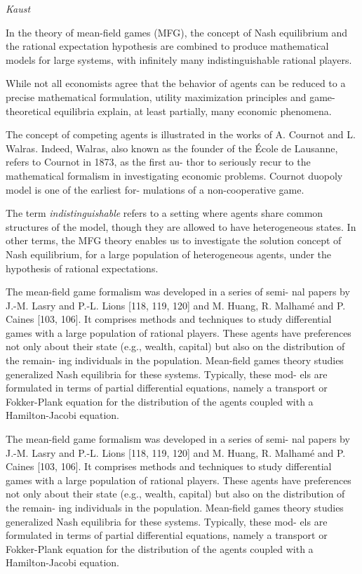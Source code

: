 \documentclass[
]{book}
\begin{document}
\emph{Kaust}

In the theory of mean-field games (MFG), the concept of Nash
equilibrium and the rational expectation hypothesis are combined to
produce mathematical models for large systems, with infinitely many
indistinguishable rational players.

While not all economists agree that the behavior of agents can be reduced
to a precise mathematical formulation, utility maximization principles
and game-theoretical equilibria explain, at least partially, many
economic phenomena.

The concept of competing agents is illustrated in the works of A.
Cournot and L. Walras. Indeed, Walras, also known as the founder
of the École de Lausanne, refers to Cournot in 1873, as the first au-
thor to seriously recur to the mathematical formalism in investigating
economic problems. Cournot duopoly model is one of the earliest for-
mulations of a non-cooperative game.

The term \emph{indistinguishable} refers
to a setting where agents share common structures of the model,
though they are allowed to have heterogeneous states. In other terms,
the MFG theory enables us to investigate the solution concept of Nash
equilibrium, for a large population of heterogeneous agents, under the
hypothesis of rational expectations.

The mean-field game formalism was developed in a series of semi-
nal papers by J.-M. Lasry and P.-L. Lions {[}118, 119, 120{]} and M.
Huang, R. Malhamé and P. Caines {[}103, 106{]}. It comprises methods
and techniques to study differential games with a large population of
rational players. These agents have preferences not only about their
state (e.g., wealth, capital) but also on the distribution of the remain-
ing individuals in the population. Mean-field games theory studies
generalized Nash equilibria for these systems. Typically, these mod-
els are formulated in terms of partial differential equations, namely a
transport or Fokker-Plank equation for the distribution of the agents
coupled with a Hamilton-Jacobi equation.

The mean-field game formalism was developed in a series of semi-
nal papers by J.-M. Lasry and P.-L. Lions {[}118, 119, 120{]} and M.
Huang, R. Malhamé and P. Caines {[}103, 106{]}. It comprises methods
and techniques to study differential games with a large population of
rational players. These agents have preferences not only about their
state (e.g., wealth, capital) but also on the distribution of the remain-
ing individuals in the population. Mean-field games theory studies
generalized Nash equilibria for these systems. Typically, these mod-
els are formulated in terms of partial differential equations, namely a
transport or Fokker-Plank equation for the distribution of the agents
coupled with a Hamilton-Jacobi equation.
\end{document}
